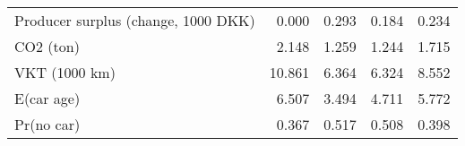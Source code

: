 \begin{tabular}{lrrrr}
     Producer surplus (change, 1000 DKK) &        0.000&        0.293&        0.184&        0.234 \\ 
                               CO2 (ton) &        2.148&        1.259&        1.244&        1.715 \\ 
                           VKT (1000 km) &       10.861&        6.364&        6.324&        8.552 \\ 
                              E(car age) &        6.507&        3.494&        4.711&        5.772 \\ 
                              Pr(no car) &        0.367&        0.517&        0.508&        0.398 \\ 
\bottomrule 
\end{tabular}
